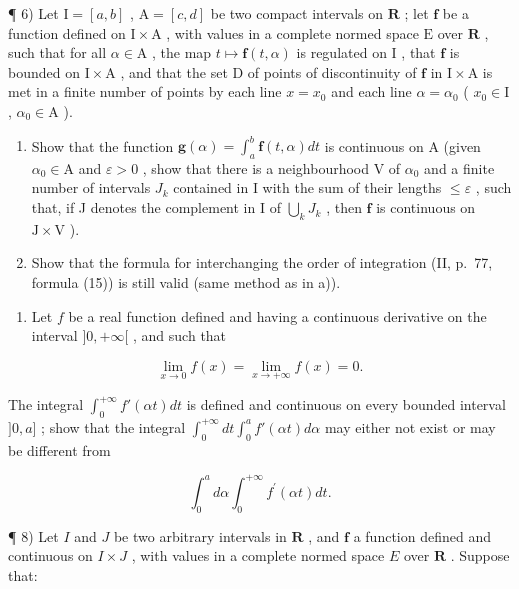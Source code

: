¶ 6) Let \(\mathrm{I} = [a, b]\) , \(\mathrm{A} = [c, d]\) be two compact intervals on \(\mathbf{R}\) ; let \(\mathbf{f}\) be a function defined on \(\mathrm{I} \times \mathrm{A}\) , with values in a complete normed space \(\mathrm{E}\) over \(\mathbf{R}\) , such that for all \(\alpha \in \mathrm{A}\) , the map \(t \mapsto \mathbf{f}(t, \alpha)\) is regulated on \(\mathrm{I}\) , that \(\mathbf{f}\) is bounded on \(\mathrm{I} \times \mathrm{A}\) , and that the set \(\mathrm{D}\) of points of discontinuity of \(\mathbf{f}\) in \(\mathrm{I} \times \mathrm{A}\) is met in a finite number of points by each line \(x = x_0\) and each line \(\alpha = \alpha_0\) ( \(x_0 \in \mathrm{I}\) , \(\alpha_0 \in \mathrm{A}\) ).

\begin{enumerate}
\def\labelenumi{\alph{enumi})}
\item
  Show that the function \(\mathbf{g}(\alpha) = \int_{a}^{b} \mathbf{f}(t, \alpha) dt\) is continuous on A (given \(\alpha_0 \in \mathrm{A}\) and \(\varepsilon > 0\) , show that there is a neighbourhood V of \(\alpha_0\) and a finite number of intervals \(J_k\) contained in I with the sum of their lengths \(\leqslant \varepsilon\) , such that, if J denotes the complement in I of \(\bigcup_{k} J_k\) , then \(\mathbf{f}\) is continuous on \(\mathrm{J} \times \mathrm{V}\) ).
\item
  Show that the formula for interchanging the order of integration (II, p.~77, formula (15)) is still valid (same method as in a)).
\end{enumerate}

\begin{enumerate}
\def\labelenumi{\arabic{enumi})}
\setcounter{enumi}{6}
\tightlist
\item
  Let \(f\) be a real function defined and having a continuous derivative on the interval \(]0, +\infty[\) , and such that
\end{enumerate}

\[
\lim _ {x \to 0} f (x) = \lim _ {x \to + \infty} f (x) = 0.
\]

The integral \(\int_0^{+\infty}f'(\alpha t)dt\) is defined and continuous on every bounded interval \(]0,a]\) ; show that the integral \(\int_0^{+\infty}dt\int_0^a f'(\alpha t)d\alpha\) may either not exist or may be different from

\[
\int_ {0} ^ {a} d \alpha \int_ {0} ^ {+ \infty} f ^ {\prime} (\alpha t) d t.
\]

¶ 8) Let \(I\) and \(J\) be two arbitrary intervals in \(\mathbf{R}\) , and \(\mathbf{f}\) a function defined and continuous on \(I \times J\) , with values in a complete normed space \(E\) over \(\mathbf{R}\) . Suppose that:


